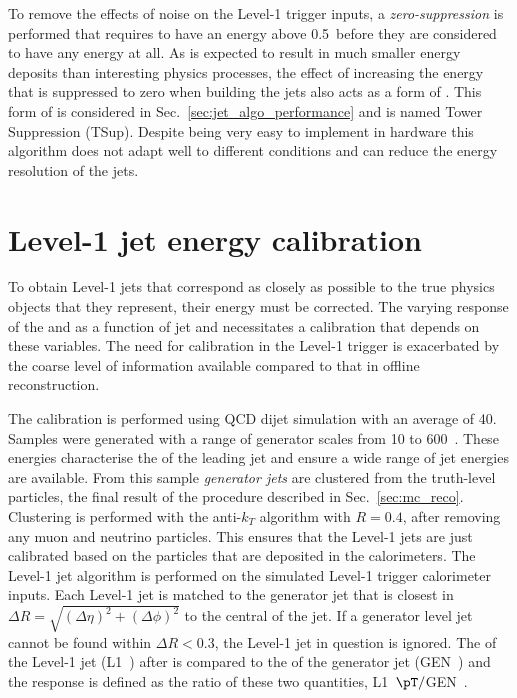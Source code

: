 To remove the effects of noise on the Level-1 trigger inputs, a
\emph{zero-suppression} is performed that requires \TTs to have an
energy above 0.5~\gev before they are considered to have any energy at
all. As \PU is expected to result in much smaller energy deposits than
interesting physics processes, the effect of increasing the energy
that is suppressed to zero when building the jets also acts as a form
of \PUS. This form of \PUS is considered in
Sec.~\ref{sec:jet_algo_performance} and is named Tower Suppression
(TSup). Despite being very easy to implement in hardware this
algorithm does not adapt well to different \PU conditions and can
reduce the energy resolution of the jets.

\section{Level-1 jet energy calibration}
\label{sec:l1jec}

To obtain Level-1 jets that correspond as closely as possible to the
true physics objects that they represent, their energy must be
corrected. The
varying response of the \HCAL and \ECAL as a function of jet \pT and
\eta necessitates a calibration that depends on these variables.  The
need for calibration in the Level-1 trigger is exacerbated by the
coarse level of information available compared to that in offline
reconstruction.

The calibration is performed using QCD dijet \MC simulation with an
average \PU of 40. Samples were generated with a range of generator
scales from 10 to 600~\gev. These energies characterise the \pT of the
leading jet and ensure a wide range of jet energies are available. From this sample \emph{generator jets} are clustered from
the truth-level particles, the final result of the procedure
described in Sec.~\ref{sec:mc_reco}. Clustering is performed with the
anti-$k_T$ algorithm with $R=0.4$, after removing any muon and
neutrino particles. This ensures that the Level-1 jets are just
calibrated based on the particles that are deposited in the
calorimeters. The Level-1 jet algorithm is performed on the simulated
Level-1
trigger calorimeter inputs. Each Level-1 jet is matched to the
generator jet that is closest in $\Delta
R=\sqrt{(\Delta\eta)^2+(\Delta\phi)^2}$ to the central \TT of the jet.
If a generator level jet cannot be found within $\Delta R<0.3$, the
Level-1 jet in question is ignored. The \pT of the Level-1 jet
(L1~\pT) after \PUS is compared to the \pT of the generator jet
(GEN~\pT) and the response is defined as the ratio of these two
quantities, L1~$\pT/$GEN~\pT.

